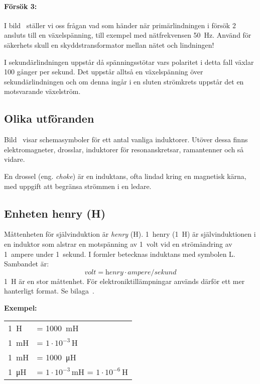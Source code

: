\paragraph{Försök 3:}
I bild~ ställer vi oss frågan vad som händer när
primärlindningen i försök 2 ansluts till en växelspänning, till exempel
med nätfrekvensen \qty{50}{\hertz}.
Använd för säkerhets skull en skyddstransformator mellan nätet och lindningen!

I sekundärlindningen uppstår då spänningsstötar vars polaritet i detta fall
växlar 100 gånger per sekund.
Det uppstår alltså en växelspänning över sekundärlindningen och om denna ingår i
en sluten strömkrets uppstår det en motsvarande växelström.


\subsection{Olika utföranden}

Bild~ visar schemasymboler för ett antal vanliga induktorer.
Utöver dessa finns elektromagneter, drosslar, induktorer för resonanskretsar,
ramantenner och så vidare.

En drossel (eng. \emph{choke}) är en induktans, ofta lindad kring en 
magnetisk 
kärna, med uppgift att begränsa strömmen i en ledare.


\subsection{Enheten henry (H)}
\label{enheten_henry}

Måttenheten för självinduktion är \emph{henry} (\unit{\henry}).
1~henry (\qty{1}{\henry}) är självinduktionen i en induktor som alstrar en
motspänning av 1~volt vid en strömändring av 1~ampere under 1~sekund.
I formler betecknas induktans med symbolen L.
Sambandet är:
\[\textit{volt} = \textit{henry} \cdot \textit{ampere}/\textit{sekund}\]
\qty{1}{\henry} är en stor måttenhet.
För elektroniktillämpningar används därför ett mer hanterligt format.
Se bilaga~.

\noindent\textbf{Exempel:}

\begin{center}
\begin{tabular}{ll}
\qty{1}{\henry} & = \qty{1000}{\milli\henry} \\
\qty{1}{\milli\henry} & = \(1 \cdot 10^{-3}\)\,H \\
\qty{1}{\milli\henry} & = \qty{1000}{\micro\henry} \\
\qty{1}{\micro\henry} & = \(1 \cdot 10^{-3}\)\,mH = \(1 \cdot 10^{-6}\)\,H
\end{tabular}
\end{center}

